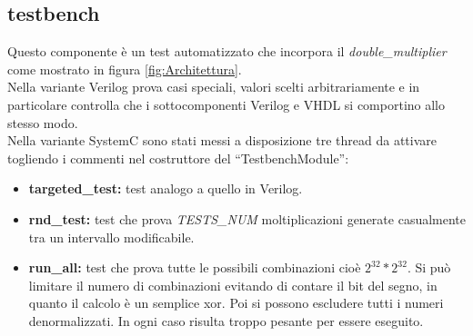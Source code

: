 \documentclass[]{IEEEtran}
\begin{document}
\subsection{testbench}
Questo componente è un test automatizzato che incorpora il \textit{double\_multiplier} come mostrato in figura \ref{fig:Architettura}. 
\\Nella variante Verilog prova casi speciali, valori scelti arbitrariamente e in particolare controlla che i sottocomponenti Verilog e VHDL si comportino allo stesso modo.
\\Nella variante SystemC sono stati messi a disposizione tre thread da attivare togliendo i commenti nel costruttore del ``TestbenchModule'':
\begin{itemize}
    \item \textbf{targeted\_test:} test analogo a quello in Verilog.
    \item \textbf{rnd\_test:} test che prova \textit{TESTS\_NUM} moltiplicazioni generate casualmente tra un intervallo modificabile.
    \item \textbf{run\_all:} test che prova tutte le possibili combinazioni cioè $2^{32} * 2^{32}$. Si può limitare il numero di combinazioni evitando di contare il bit del segno, in quanto il calcolo è un semplice xor. Poi si possono escludere tutti i numeri denormalizzati. In ogni caso risulta troppo pesante per essere eseguito.
\end{itemize}
\end{document}
